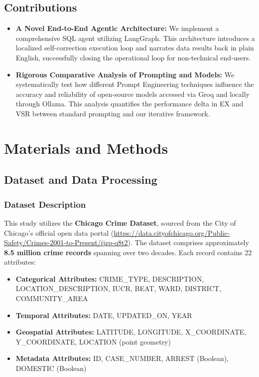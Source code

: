 \documentclass{article}
\begin{document}
\subsection{Contributions}

\begin{itemize}
    \item \textbf{A Novel End-to-End Agentic Architecture:} We implement a comprehensive SQL agent utilizing LangGraph. This architecture introduces a localized self-correction execution loop and narrates data results back in plain English, successfully closing the operational loop for non-technical end-users.
    \item \textbf{Rigorous Comparative Analysis of Prompting and Models:} We systematically test how different Prompt Engineering techniques influence the accuracy and reliability of open-source models accessed via Groq and locally through Ollama. This analysis quantifies the performance delta in EX and VSR between standard prompting and our iterative framework.
\end{itemize}

\section{Materials and Methods}

\subsection{Dataset and Data Processing}

\subsubsection{Dataset Description}
This study utilizes the \textbf{Chicago Crime Dataset}, sourced from the City of Chicago's official open data portal (\href{https://data.cityofchicago.org/Public-Safety/Crimes-2001-to-Present/ijzp-q8t2}{https://data.cityofchicago.org/Public-Safety/Crimes-2001-to-Present/ijzp-q8t2}). The dataset comprises approximately \textbf{8.5 million crime records} spanning over two decades. Each record contains 22 attributes:

\begin{itemize}
    \item \textbf{Categorical Attributes:} CRIME\_TYPE, DESCRIPTION, LOCATION\_DESCRIPTION, IUCR, BEAT, WARD, DISTRICT, COMMUNITY\_AREA\
    \item \textbf{Temporal Attributes:} DATE, UPDATED\_ON, YEAR\
    \item \textbf{Geospatial Attributes:} LATITUDE, LONGITUDE, X\_COORDINATE, Y\_COORDINATE, LOCATION (point geometry)\
    \item \textbf{Metadata Attributes:} ID, CASE\_NUMBER, ARREST (Boolean), DOMESTIC (Boolean)\\
\end{itemize}
\end{document}
